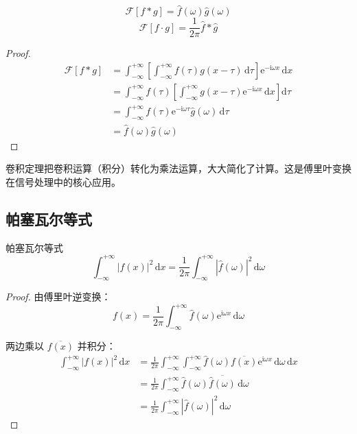 \begin{zhongyao}[卷积定理]
\[
    \mathcal{F}[f * g] = \hat{f}(\omega)\hat{g}(\omega)
\]
\[
    \mathcal{F}[f \cdot g] = \frac{1}{2\pi}\hat{f} * \hat{g}
\]
\end{zhongyao}

\begin{proof}
\begin{align}
    \mathcal{F}[f * g] &= \int_{-\infty}^{+\infty}\left[\int_{-\infty}^{+\infty} f(\tau)g(x-\tau)\,\mathrm{d}\tau\right]\mathrm{e}^{-\mathrm{i}\omega x}\,\mathrm{d}x \\
    &= \int_{-\infty}^{+\infty} f(\tau)\left[\int_{-\infty}^{+\infty} g(x-\tau)\mathrm{e}^{-\mathrm{i}\omega x}\,\mathrm{d}x\right]\mathrm{d}\tau \\
    &= \int_{-\infty}^{+\infty} f(\tau)\mathrm{e}^{-\mathrm{i}\omega\tau}\hat{g}(\omega)\,\mathrm{d}\tau \\
    &= \hat{f}(\omega)\hat{g}(\omega)
\end{align}
\end{proof}

\begin{tishi}[卷积定理的意义]
卷积定理把卷积运算（积分）转化为乘法运算，大大简化了计算。这是傅里叶变换在信号处理中的核心应用。
\end{tishi}

\subsection{帕塞瓦尔等式}

\begin{dingli}{}{帕塞瓦尔等式}
\begin{equation}
    \int_{-\infty}^{+\infty} |f(x)|^2\,\mathrm{d}x = \frac{1}{2\pi}\int_{-\infty}^{+\infty} |\hat{f}(\omega)|^2\,\mathrm{d}\omega
\end{equation}
\end{dingli}

\begin{proof}
由傅里叶逆变换：
\begin{equation}
    f(x) = \frac{1}{2\pi}\int_{-\infty}^{+\infty} \hat{f}(\omega)\mathrm{e}^{\mathrm{i}\omega x}\,\mathrm{d}\omega
\end{equation}

两边乘以 $\overline{f(x)}$ 并积分：
\begin{align}
    \int_{-\infty}^{+\infty} |f(x)|^2\,\mathrm{d}x &= \frac{1}{2\pi}\int_{-\infty}^{+\infty}\int_{-\infty}^{+\infty} \hat{f}(\omega)\overline{f(x)}\mathrm{e}^{\mathrm{i}\omega x}\,\mathrm{d}\omega\,\mathrm{d}x \\
    &= \frac{1}{2\pi}\int_{-\infty}^{+\infty} \hat{f}(\omega)\overline{\hat{f}(\omega)}\,\mathrm{d}\omega \\
    &= \frac{1}{2\pi}\int_{-\infty}^{+\infty} |\hat{f}(\omega)|^2\,\mathrm{d}\omega
\end{align}
\end{proof}

